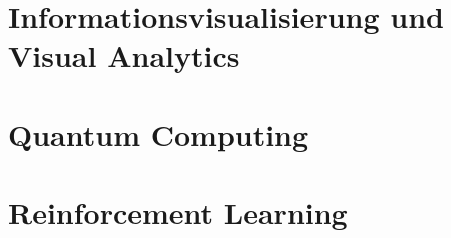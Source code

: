 \documentclass[english, notodo]{fdsummary}
\newcommand{\lstbasepath}{unset}
\begin{document}
	\cleardoublepage
	\part{Informationsvisualisierung und Visual Analytics}
	\graphicspath{{./cs/elective/vc/ivva/}}
	\renewcommand{\lstbasepath}{./cs/elective/vc/ivva}
	

	\cleardoublepage
	\part{Quantum Computing}
	\graphicspath{{./cs/elective/sf/qc/}}
	\renewcommand{\lstbasepath}{./cs/elective/sf/qc}
	

	\cleardoublepage
	\part{Reinforcement Learning}
	\graphicspath{{./cs/elective/ce/rl/}}
	\renewcommand{\lstbasepath}{./cs/elective/ce/rl}
	
\end{document}
